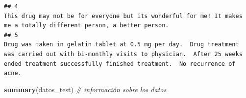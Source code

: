 \documentclass[spanish,]{article}
\newenvironment{Shaded}{\begin{snugshade}}{\end{snugshade}}
\newcommand{\KeywordTok}[1]{\textcolor[rgb]{0.13,0.29,0.53}{\textbf{#1}}}
\newcommand{\CommentTok}[1]{\textcolor[rgb]{0.56,0.35,0.01}{\textit{#1}}}
\newcommand{\NormalTok}[1]{#1}
\begin{document}
\begin{verbatim}
## 4                                                                                                                                                                                                                                                                                                                                                                                                                                                                                                                                                                                                                                                                                                                                                                                                                                                                                                                                                                                                                                                                                                                              This drug may not be for everyone but its wonderful for me! It makes me a totally different person, a better person.
## 5                                                                                                                                                                                                                                                                                                                                                                                                                                                                                                                                                                                                                                                                                                                                                                                                                                                                                                                                                                                                                                 Drug was taken in gelatin tablet at 0.5 mg per day.  Drug treatment was carried out with bi-monthly visits to physician.  After 25 weeks ended treatment successfully finished treatment.  No recurrence of acne.
\end{verbatim}

\begin{Shaded}
\begin{Highlighting}[]
\KeywordTok{summary}\NormalTok{(datos_test) }\CommentTok{# información sobre los datos}
\end{Highlighting}
\end{Shaded}
\end{document}
